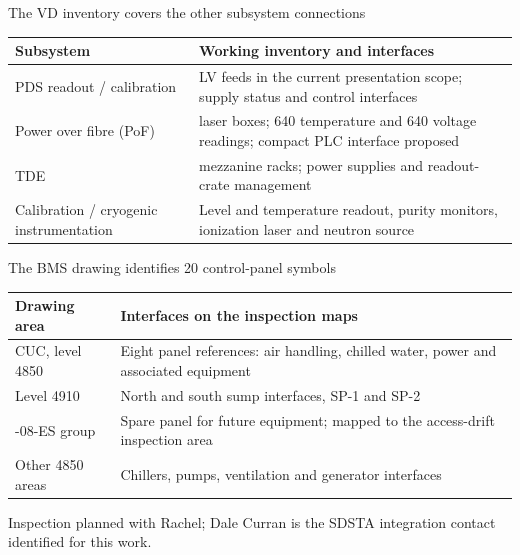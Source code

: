 \begin{frame}{The VD inventory covers the other subsystem connections}
  \renewcommand{\arraystretch}{1.35}
  \begin{tabularx}{\textwidth}{@{}>{\RaggedRight\arraybackslash}p{3.2cm}>{\RaggedRight\arraybackslash}X@{}}
    \toprule
    \textbf{Subsystem} & \textbf{Working inventory and interfaces}\\
    \midrule
    PDS readout / calibration & 34 LV feeds in the current presentation scope; supply status and control interfaces\\
    Power over fibre (PoF) & 80 laser boxes; 640 temperature and 640 voltage readings; compact PLC interface proposed\\
    TDE & 20 mezzanine racks; power supplies and readout-crate management\\
    Calibration / cryogenic instrumentation & Level and temperature readout, purity monitors, ionization laser and neutron source\\
    \bottomrule
  \end{tabularx}
\end{frame}

\begin{frame}{The BMS drawing identifies 20 control-panel symbols}
  \renewcommand{\arraystretch}{1.4}
  \begin{tabularx}{\textwidth}{@{}>{\RaggedRight\arraybackslash}p{3.4cm}>{\RaggedRight\arraybackslash}X@{}}
    \toprule
    \textbf{Drawing area} & \textbf{Interfaces on the inspection maps}\\
    \midrule
    CUC, level 4850 & Eight panel references: air handling, chilled water, power and associated equipment\\
    Level 4910 & North and south sump interfaces, SP-1 and SP-2\\
    4850-08-ES group & Spare panel for future equipment; mapped to the access-drift inspection area\\
    Other 4850 areas & Chillers, pumps, ventilation and generator interfaces\\
    \bottomrule
  \end{tabularx}\par
  \medskip
  Inspection planned with Rachel; Dale Curran is the SDSTA integration contact identified for this work.
\end{frame}


